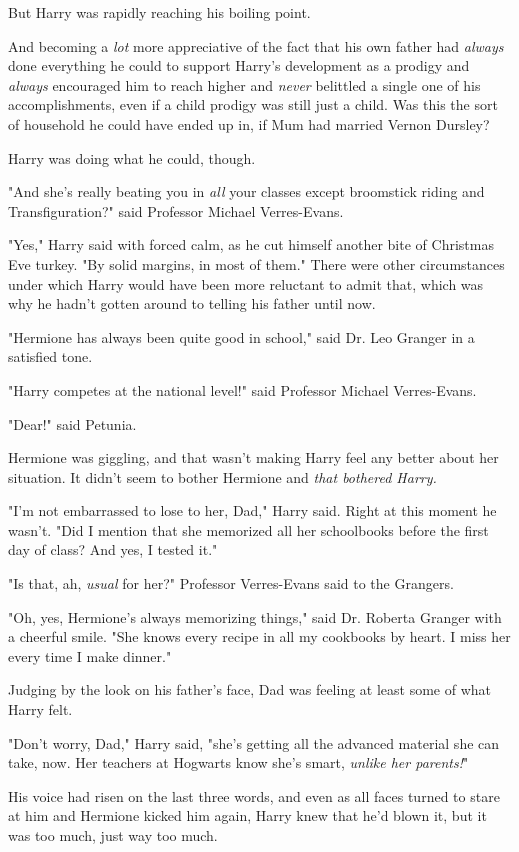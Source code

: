 But Harry was rapidly reaching his boiling point.

And becoming a \emph{lot} more appreciative of the fact that his own father had
\emph{always} done everything he could to support Harry's development as a
prodigy and \emph{always} encouraged him to reach higher and \emph{never}
belittled a single one of his accomplishments, even if a child prodigy was
still just a child. Was this the sort of household he could have ended up in,
if Mum had married Vernon Dursley?

Harry was doing what he could, though.

"And she's really beating you in \emph{all} your classes except broomstick
riding and Transfiguration?" said Professor Michael Verres-Evans.

"Yes," Harry said with forced calm, as he cut himself another bite of Christmas
Eve turkey. "By solid margins, in most of them." There were other circumstances
under which Harry would have been more reluctant to admit that, which was why
he hadn't gotten around to telling his father until now.

"Hermione has always been quite good in school," said Dr. Leo Granger in a
satisfied tone.

"Harry competes at the national level!" said Professor Michael Verres-Evans.

"Dear!" said Petunia.

Hermione was giggling, and that wasn't making Harry feel any better about her
situation. It didn't seem to bother Hermione and \emph{that bothered Harry.}

"I'm not embarrassed to lose to her, Dad," Harry said. Right at this moment he
wasn't. "Did I mention that she memorized all her schoolbooks before the first
day of class? And yes, I tested it."

"Is that, ah, \emph{usual} for her?" Professor Verres-Evans said to the
Grangers.

"Oh, yes, Hermione's always memorizing things," said Dr. Roberta Granger with a
cheerful smile. "She knows every recipe in all my cookbooks by heart. I miss
her every time I make dinner."

Judging by the look on his father's face, Dad was feeling at least some of what
Harry felt.

"Don't worry, Dad," Harry said, "she's getting all the advanced material she
can take, now. Her teachers at Hogwarts know she's smart, \emph{unlike her
parents!}"

His voice had risen on the last three words, and even as all faces turned to
stare at him and Hermione kicked him again, Harry knew that he'd blown it, but
it was too much, just way too much.

